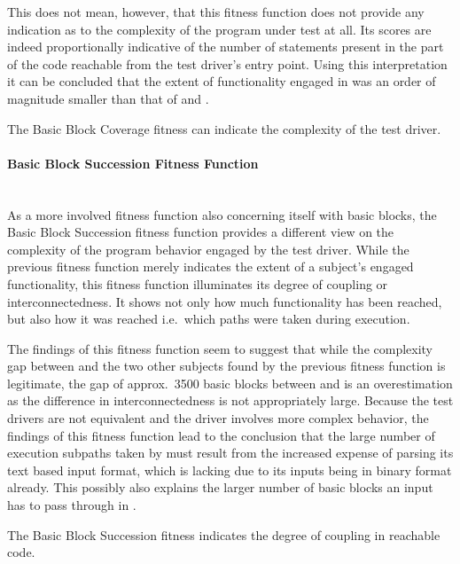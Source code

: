 This does not mean, however, that this fitness function does not provide any indication as to the complexity of
the program under test at all. Its scores are indeed proportionally indicative of the number of statements
present in the part of the code reachable from the test driver's entry point. Using this interpretation it can
be concluded that the extent of functionality engaged in \libpcap was an order of magnitude smaller than that
of \libpng and \libxml.

\begin{mdframed}
\centering
The Basic Block Coverage fitness can indicate the complexity of the test driver. 
\end{mdframed}

\paragraph{Basic Block Succession Fitness Function} ~\\
As a more involved fitness function also concerning itself with basic blocks, the Basic Block Succession
fitness function provides a different view on the complexity of the program behavior engaged by the test
driver.
While the previous fitness function merely indicates the extent of a subject's engaged functionality, this
fitness function illuminates its degree of coupling or interconnectedness. It shows not only how much
functionality has been reached, but also how it was reached i.e.\ which paths were taken during execution.

The findings of this fitness function seem to suggest that while the complexity gap between \libpcap and the
two other subjects found by the previous fitness function is legitimate, the gap of approx.\ 3500 basic blocks
between \libpng and \libxml is an overestimation as the difference in interconnectedness is not appropriately
large. Because the test drivers are not equivalent and the \libpng driver involves more complex
behavior, the findings of this fitness function lead to the conclusion that the large number of execution
subpaths taken by \libxml must result from the increased expense of parsing its text based input format, which
\libpng is lacking due to its inputs being in binary format already. This possibly also explains the larger
number of basic blocks an input has to pass through in \libxml.

\begin{mdframed}
\centering
The Basic Block Succession fitness indicates the degree of coupling in reachable code.
\end{mdframed}

